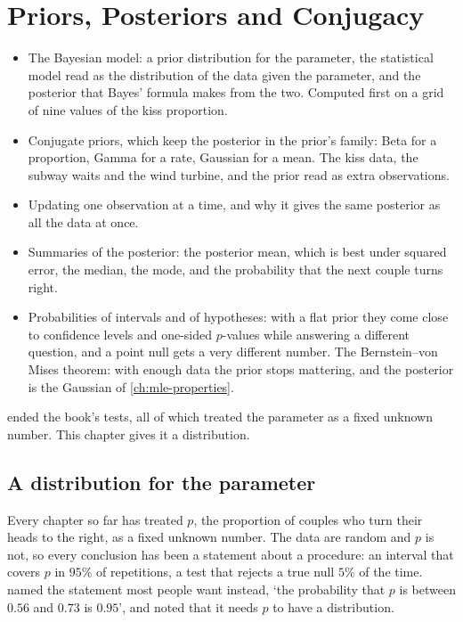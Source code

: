 \chapter{Priors, Posteriors and Conjugacy}
\label{ch:bayes-intro}

\begin{chaptergoals}
\begin{itemize}[nosep]
\item The Bayesian model: a prior distribution for the parameter, the statistical model read as the distribution of the data given the parameter, and the posterior that Bayes' formula makes from the two. Computed first on a grid of nine values of the kiss proportion.
\item Conjugate priors, which keep the posterior in the prior's family: Beta for a proportion, Gamma for a rate, Gaussian for a mean. The kiss data, the subway waits and the wind turbine, and the prior read as extra observations.
\item Updating one observation at a time, and why it gives the same posterior as all the data at once.
\item Summaries of the posterior: the posterior mean, which is best under squared error, the median, the mode, and the probability that the next couple turns right.
\item Probabilities of intervals and of hypotheses: with a flat prior they come close to confidence levels and one-sided $p$-values while answering a different question, and a point null gets a very different number. The Bernstein--von Mises theorem: with enough data the prior stops mattering, and the posterior is the Gaussian of \cref{ch:mle-properties}.
\end{itemize}
 ended the book's tests, all of which treated the parameter as a fixed unknown number. This chapter gives it a distribution.
\end{chaptergoals}

\section{A distribution for the parameter}
\label{sec:bayes-why}

Every chapter so far has treated $p$, the proportion of couples who turn their heads to the right, as a fixed unknown number.
The data are random and $p$ is not, so every conclusion has been a statement about a procedure: an interval that covers $p$ in $95\%$ of repetitions, a test that rejects a true null $5\%$ of the time.
 named the statement most people want instead, `the probability that $p$ is between $0.56$ and $0.73$ is $0.95$', and noted that it needs $p$ to have a distribution.

